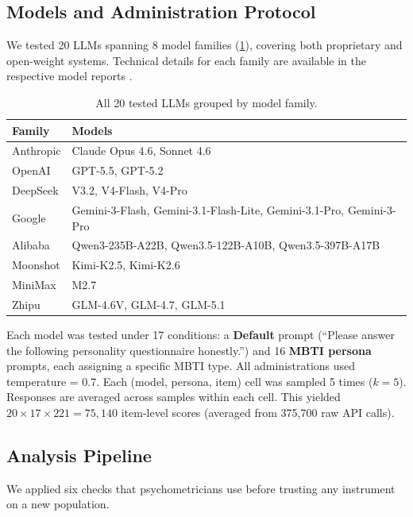\documentclass[11pt]{article}
\begin{document}
\subsection{Models and Administration Protocol}

We tested 20 LLMs spanning 8 model families (\cref{tab:models}), covering both proprietary and open-weight systems. Technical details for each family are available in the respective model reports \citep{openai2023gpt4, gemini2024v15, deepseek2024v3, qwen2024qwen25, glm2024chatglm, moonshot2025kimi, minimax2025minimax01}.

\begin{table}[t]
\centering
\small
\caption{All 20 tested LLMs grouped by model family.}
\label{tab:models}
\begin{tabular}{l>{\centering\arraybackslash}p{5.2cm}}
\toprule
Family & Models \\
\midrule
Anthropic & Claude Opus 4.6, Sonnet 4.6 \\
OpenAI & GPT-5.5, GPT-5.2 \\
DeepSeek & V3.2, V4-Flash, V4-Pro \\
Google & Gemini-3-Flash, Gemini-3.1-Flash-Lite, Gemini-3.1-Pro, Gemini-3-Pro \\
Alibaba & Qwen3-235B-A22B, Qwen3.5-122B-A10B, Qwen3.5-397B-A17B \\
Moonshot & Kimi-K2.5, Kimi-K2.6 \\
MiniMax & M2.7 \\
Zhipu & GLM-4.6V, GLM-4.7, GLM-5.1 \\
\bottomrule
\end{tabular}
\end{table}

Each model was tested under 17 conditions: a \textbf{Default} prompt (``Please answer the following personality questionnaire honestly.'') and 16 \textbf{MBTI persona} prompts, each assigning a specific MBTI type. All administrations used temperature = 0.7. Each (model, persona, item) cell was sampled 5 times ($k{=}5$). Responses are averaged across samples within each cell. This yielded $20 \times 17 \times 221 = 75{,}140$ item-level scores (averaged from 375{,}700 raw API calls).

\subsection{Analysis Pipeline}

We applied six checks that psychometricians use before trusting any instrument on a new population.
\end{document}
